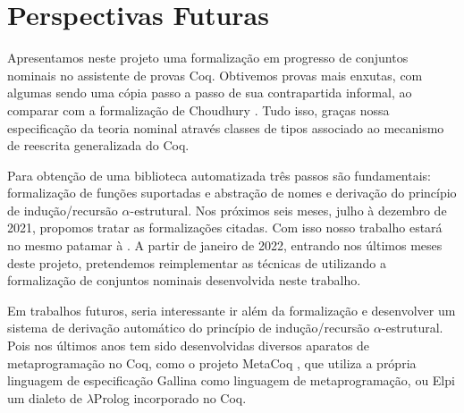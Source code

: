 \chapter{Perspectivas Futuras}\label{chp:perspectivas}
Apresentamos neste projeto uma formalização em progresso de conjuntos nominais no assistente de provas Coq. Obtivemos provas mais enxutas, com algumas sendo uma cópia passo a passo de sua contrapartida informal, ao comparar com a formalização de Choudhury \cite{AgdaNominal}. Tudo isso, graças nossa especificação da teoria nominal através classes de tipos associado ao mecanismo de reescrita generalizada do Coq.

Para obtenção de uma biblioteca automatizada três passos são fundamentais: formalização de funções suportadas e abstração de nomes e derivação do princípio de indução/recursão $\alpha$-estrutural. Nos próximos seis meses, julho à dezembro de 2021, propomos tratar as formalizações citadas. Com isso nosso trabalho estará no mesmo patamar à \cite{Choudhury2015}. A partir de janeiro de 2022, entrando nos últimos meses deste projeto, pretendemos reimplementar as técnicas de \cite{Copello2016} utilizando a formalização de conjuntos nominais desenvolvida neste trabalho.

Em trabalhos futuros, seria interessante ir além da formalização e desenvolver um sistema de derivação automático do princípio de indução/recursão $\alpha$-estrutural. Pois nos últimos anos tem sido desenvolvidas diversos aparatos de metaprogramação no Coq, como o projeto MetaCoq \cite{Sozeau2020}, que utiliza a própria linguagem de especificação Gallina como linguagem de metaprogramação, ou Elpi \cite{Dunchev2015,Tassi2018} um dialeto de $\lambda$Prolog \cite{Miller2009} incorporado no Coq.
